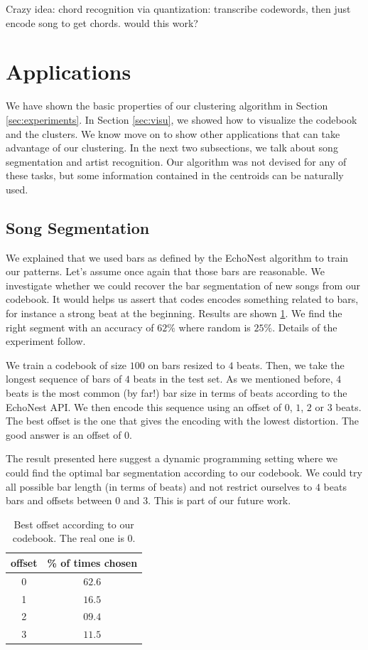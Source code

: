 \documentclass{article}
\begin{document}
Crazy idea: chord recognition via quantization: transcribe codewords,
then just encode song to get chords. would this work?



\section{Applications}\label{sec:exps2}
We have shown the basic properties of our clustering algorithm in
Section \ref{sec:experiments}. In Section \ref{sec:visu}, we showed
how to visualize the codebook and the clusters. We know move on to
show other applications that can take advantage of our clustering.
In the next two subsections, we talk about song segmentation and
artist recognition. Our algorithm was not devised for any of these tasks,
but some information contained in the centroids can be naturally used.

\subsection{Song Segmentation}
We explained that we used bars as defined by the EchoNest algorithm to
train our patterns. Let's assume once again that those bars are
reasonable. We investigate whether we could recover the bar segmentation
of new songs from our codebook. It would helps us assert that codes
encodes something related to bars, for instance a strong beat at the
beginning. Results are shown \ref{tab:offset}. We find the right segment
with an accuracy of $62\%$ where random is $25\%$. Details of the
experiment follow.

We train a codebook of size $100$ on bars resized to $4$ beats. Then,
we take the longest sequence of bars of $4$ beats in the test set.
As we mentioned before, $4$ beats is the most common (by far!) bar size
in terms of beats according to the EchoNest API. We then encode this
sequence using an offset of $0$, $1$, $2$ or $3$ beats. The best offset
is the one that gives the encoding with the lowest distortion. The
good answer is an offset of $0$.

The result presented here suggest a dynamic programming setting where
we could find the optimal bar segmentation according to our codebook. 
We could try
all possible bar length (in terms of beats) and not restrict ourselves
to $4$ beats bars and offsets between $0$ and $3$. This is part of
our future work.

\begin{table}
\begin{center}
\begin{tabular}{c|c}
offset & \% of times chosen \\ \hline
0 & $\mathbf{62.6}$\\
1 & $16.5$\\
2 & $09.4$\\
3 & $11.5$\\
\end{tabular}
\end{center}
\caption{\small{
Best offset according to our codebook. The real one is $0$.
}}
\label{tab:offset}
\end{table}
\end{document}
